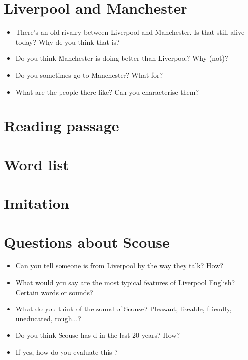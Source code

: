 	\section*{Liverpool and Manchester}
	\begin{multicols}{2}
		\begin{itemize}
			\item There's an old rivalry between Liverpool and Manchester. Is that still alive today? Why do you think that is?
			\item Do you think Manchester is doing better than Liverpool? Why (not)?
			\item Do you sometimes go to Manchester? What for?
			\item What are the people there like? Can you characterise them?
		\end{itemize}
	\end{multicols}
	
	\section*{Reading passage}

	\section*{Word list}

	\section*{Imitation}

	\section*{Questions about Scouse}
	\begin{multicols}{2}
		\begin{itemize}
			\item Can you tell someone is from Liverpool by the way they talk? How?
			\item What would you say are the most typical features of Liverpool English? Certain words or sounds?
			\item What do you think of the sound of Scouse? Pleasant, likeable, friendly, uneducated, rough...?
			\item Do you think Scouse has d in the last 20 years? How? 
			\item If yes, how do you evaluate this ?
		\end{itemize}		
	\end{multicols}